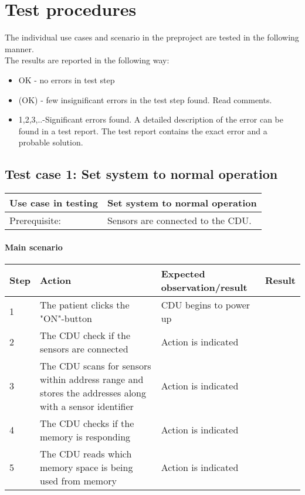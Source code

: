\chapter{Test procedures}
The individual use cases and scenario in the %
preproject are tested in the following manner.\\

The results are reported in the following way:
\begin{itemize}[bullet]
\item OK - no errors in test step
\item (OK) - few insignificant errors in the test step found. Read comments.
\item 1,2,3,..-Significant errors found. A detailed description of  the error can be found in a test report. The test report contains the exact error and a probable solution.
\end{itemize}

\section{Test case 1: Set system to normal operation}
\begin{table}[H]
    \begin{tabular}{|l|p{7cm}|}
    \hline
    Use case in testing & Set system to normal operation \\ \hline
    Prerequisite: & Sensors are connected to the CDU. \\ \hline
    \end{tabular}
\end{table}

\subsubsection{Main scenario}
\begin{table}[H]
    \begin{tabular}{|l|p{7cm}|p{5cm}|l|}
    \hline
    Step & Action & Expected observation/result & Result \\ \hline
    1 & The patient clicks the "ON"-button & CDU begins to power up & ~ \\ \hline
    2 & The CDU check if the sensors are connected & Action is indicated & ~ \\ \hline
    3 & The CDU scans for sensors within address range and stores the addresses along with a sensor identifier & Action is indicated & ~ \\ \hline
    4 & The CDU checks if the memory is responding & Action is indicated & ~ \\ \hline
    5 & The CDU reads which memory space is being used from memory & Action is indicated & ~ \\ \hline
    \end{tabular}
\end{table}

